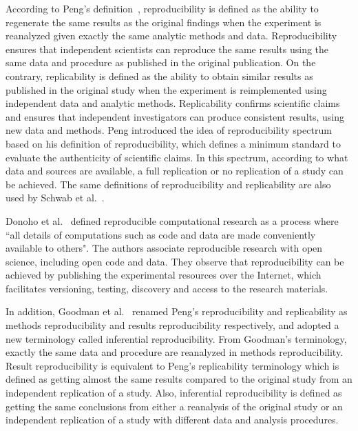 According to Peng's definition~\cite{peng2011reproducible}, 
reproducibility is defined as the ability to regenerate the same 
results as the original findings when the experiment is reanalyzed 
given exactly the same analytic methods and data. Reproducibility 
ensures that independent scientists can reproduce the same results 
using the same data and procedure as published in the original 
publication. On the contrary, replicability is defined as the ability 
to obtain similar results as published in the original study when 
the experiment is reimplemented using independent data and analytic 
methods. Replicability confirms scientific claims and ensures that 
independent investigators can produce consistent results, using new 
data and methods. Peng introduced the idea of reproducibility 
spectrum based on his definition of reproducibility, which defines a 
minimum standard to evaluate the authenticity of scientific claims. 
In this spectrum, according to what data and sources are available, a 
full replication or no replication of a study can be achieved. 
The same definitions of reproducibility and replicability 
are also used by Schwab et al.~\cite{schwab2000making}.

Donoho et al.~\cite{donoho2009reproducible} defined reproducible 
computational research as a process where ``all details of 
computations such as code and data are made conveniently available to 
others". The authors associate reproducible research with open science,
including open code and data. They observe that 
reproducibility can be achieved by publishing the experimental 
resources over the Internet, which facilitates versioning, testing, 
discovery and access to the research materials. 

In addition, Goodman et al.~\cite{goodman2016does} renamed Peng's 
reproducibility and replicability as methods 
reproducibility and results reproducibility respectively, and adopted a 
new terminology called inferential reproducibility.
From Goodman's terminology, exactly the same data and procedure are 
reanalyzed in methods reproducibility. Result reproducibility is 
equivalent to Peng's replicability terminology which is defined as 
getting almost the same results compared to the original study from an 
independent replication of a study. Also, inferential reproducibility 
is defined as getting the same conclusions from either a reanalysis of 
the original study or an independent replication of a study with 
different data and analysis procedures.
 
